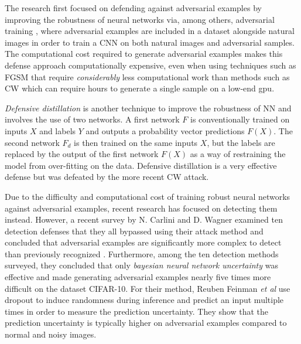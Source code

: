 The research first focused on defending against adversarial examples by
improving the robustness of neural networks via, among others, adversarial
training \cite{goodfellow_explaining_2015,papernot_limitations_2015}, where
adversarial examples are included in a dataset alongside natural images in order
to train a CNN on both natural images and adversarial samples. The computational
cost required to generate adversarial examples makes this defense approach
computationally expensive, even when using techniques such as FGSM that require
\emph{considerably} less computational work than methods such as CW which can
require hours to generate a single sample on a low-end gpu.

\textit{Defensive distillation} \cite{papernot_distillation_2016} is another
technique to improve the robustness of NN and involves the use of two networks.
A first network $F$ is conventionally trained on inputs $X$ and labels $Y$ and
outputs a probability vector predictions $F(X)$. The second network $F_{d}$ is
then trained on the same inputs $X$, but the labels are replaced by the output
of the first network $F(X)$ as a way of restraining the model from over-fitting
on the data. Defensive distillation is a very effective defense but was defeated
by the more recent CW attack.

Due to the difficulty and computational cost of training robust neural networks
against adversarial examples, recent research has focused on detecting them
instead. However, a recent survey by N. Carlini and D. Wagner examined ten
detection defenses that they all bypassed using their attack method and
concluded that adversarial examples are significantly more complex to detect
than previously recognized \cite{carlini_adversarial_2017}. Furthermore, among
the ten detection methods surveyed, they concluded that only \textit{bayesian
neural network uncertainty} \cite{feinman_detecting_2017} was effective and made
generating adversarial examples nearly five times more difficult on the dataset
CIFAR-10. For their method, Reuben Feinman \emph{et al} use dropout
\cite{srivastava_dropout_2014} to induce randomness during inference and predict
an input multiple times in order to measure the prediction uncertainty. They
show that the prediction uncertainty is typically higher on adversarial examples
compared to normal and noisy images.

